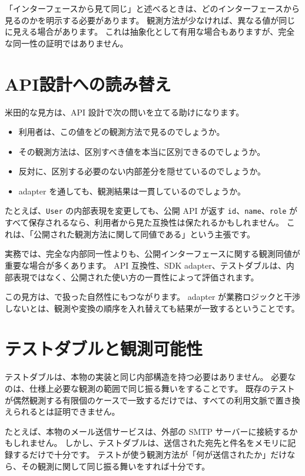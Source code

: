 「インターフェースから見て同じ」と述べるときは、どのインターフェースから見るのかを明示する必要があります。
観測方法が少なければ、異なる値が同じに見える場合があります。
これは抽象化として有用な場合もありますが、完全な同一性の証明ではありません。

\section{API設計への読み替え}

米田的な見方は、API 設計で次の問いを立てる助けになります。

\begin{itemize}
\item 利用者は、この値をどの観測方法で見るのでしょうか。
\item その観測方法は、区別すべき値を本当に区別できるのでしょうか。
\item 反対に、区別する必要のない内部差分を隠せているのでしょうか。
\item adapter を通しても、観測結果は一貫しているのでしょうか。
\end{itemize}

たとえば、\texttt{User} の内部表現を変更しても、公開 API が返す \texttt{id}、\texttt{name}、\texttt{role} がすべて保存されるなら、利用者から見た互換性は保たれるかもしれません。
これは、「公開された観測方法に関して同値である」という主張です。

実務では、完全な内部同一性よりも、公開インターフェースに関する観測同値が重要な場合が多くあります。
API 互換性、SDK adapter、テストダブルは、内部表現ではなく、公開された使い方の一貫性によって評価されます。

この見方は、で扱った自然性にもつながります。
adapter が業務ロジックと干渉しないとは、観測や変換の順序を入れ替えても結果が一致するということです。

\section{テストダブルと観測可能性}

テストダブルは、本物の実装と同じ内部構造を持つ必要はありません。
必要なのは、仕様上必要な観測の範囲で同じ振る舞いをすることです。
既存のテストが偶然観測する有限個のケースで一致するだけでは、すべての利用文脈で置き換えられるとは証明できません。

たとえば、本物のメール送信サービスは、外部の SMTP サーバーに接続するかもしれません。
しかし、テストダブルは、送信された宛先と件名をメモリに記録するだけで十分です。
テストが使う観測方法が「何が送信されたか」だけなら、その観測に関して同じ振る舞いをすれば十分です。

